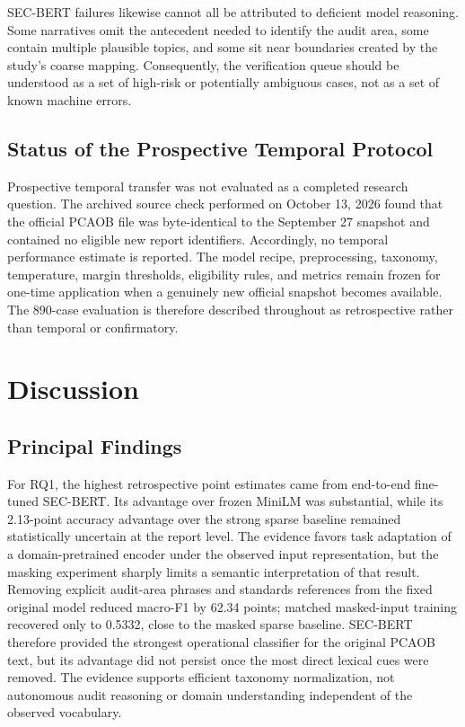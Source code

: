 \documentclass[11pt]{article}
\begin{document}
SEC-BERT failures likewise cannot all be attributed to deficient model reasoning.
Some narratives omit the antecedent needed to identify the audit area, some contain
multiple plausible topics, and some sit near boundaries created by the study's
coarse mapping. Consequently, the verification queue should be understood as a
set of high-risk or potentially ambiguous cases, not as a set of known machine
errors.

\subsection{Status of the Prospective Temporal Protocol}

Prospective temporal transfer was not evaluated as a completed research question.
The archived source check
performed on October 13, 2026 found that the official PCAOB file was byte-identical
to the September 27 snapshot and contained no eligible new report identifiers.
Accordingly, no temporal performance estimate is reported. The model recipe,
preprocessing, taxonomy, temperature, margin thresholds, eligibility rules, and
metrics remain frozen for one-time application when a genuinely new official
snapshot becomes available. The 890-case evaluation is therefore described
throughout as retrospective rather than temporal or confirmatory.

\section{Discussion}
\label{sec:discussion}

\subsection{Principal Findings}

For RQ1, the highest retrospective point estimates came from end-to-end fine-tuned
SEC-BERT. Its advantage over frozen MiniLM was substantial, while its 2.13-point
accuracy advantage over the strong sparse baseline remained statistically
uncertain at the report level. The evidence favors task adaptation of a
domain-pretrained encoder under the observed input representation, but the
masking experiment sharply limits a semantic interpretation of that result.
Removing explicit audit-area phrases and standards references from the fixed
original model reduced macro-F1 by 62.34 points; matched masked-input training
recovered only to 0.5332, close to the masked sparse baseline. SEC-BERT therefore
provided the strongest operational classifier for the original PCAOB text, but
its advantage did not persist once the most direct lexical cues were removed.
The evidence supports efficient taxonomy normalization, not autonomous audit
reasoning or domain understanding independent of the observed vocabulary.
\end{document}
